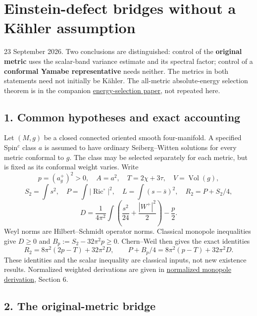 \documentclass[
  11pt,
]{article}
\author{}
\date{23 September 2026}
\begin{document}
\hypertarget{einstein-defect-bridges-without-a-kuxe4hler-assumption}{%
\section{Einstein-defect bridges without a Kähler
assumption}\label{einstein-defect-bridges-without-a-kuxe4hler-assumption}}

23 September 2026. Two conclusions are distinguished: control of the
\textbf{original metric} uses the scalar-band variance estimate and its
spectral factor; control of a \textbf{conformal Yamabe representative}
needs neither. The metrics in both statements need not initially be
Kähler. The all-metric absolute-energy selection theorem is in the
companion \href{line1_energy_selection.md}{energy-selection paper}, not
repeated here.

\hypertarget{common-hypotheses-and-exact-accounting}{%
\subsection{1. Common hypotheses and exact
accounting}\label{common-hypotheses-and-exact-accounting}}

Let \((M,g)\) be a closed connected oriented smooth four-manifold. A
specified Spin\(^c\) class \(a\) is assumed to have ordinary
Seiberg--Witten solutions for every metric conformal to \(g\). The class
may be selected separately for each metric, but is fixed as its
conformal weight varies. Write \[
 p=(a_g^+)^2>0,\quad A=a^2,\quad T=2\chi+3\tau,\quad V=\operatorname{Vol}(g),
\] \[
 S_2=\int s^2,\quad P=\int|\operatorname{Ric}^{\circ}|^2,\quad
 L=\int(s-\bar s)^2,\quad R_2=P+S_2/4,
\] \[
 D=\frac1{4\pi^2}\int\left(\frac{s^2}{24}+\frac{|W^+|^2}{2}\right)-\frac p2.
 \tag{1}
\] Weyl norms are Hilbert--Schmidt operator norms. Classical monopole
inequalities give \(D\ge0\) and \(B_p:=S_2-32\pi^2p\ge0\). Chern--Weil
then gives the exact identities \[
 R_2=8\pi^2(2p-T)+32\pi^2D,\qquad
 P+B_p/4=8\pi^2(p-T)+32\pi^2D.
 \tag{2}
\] These identities and the scalar inequality are classical inputs, not
new existence results. Normalized weighted derivations are given in
\href{round3_monopole_input.md}{normalized monopole derivation}, Section
6.

\hypertarget{the-original-metric-bridge}{%
\subsection{2. The original-metric
bridge}\label{the-original-metric-bridge}}
\end{document}
